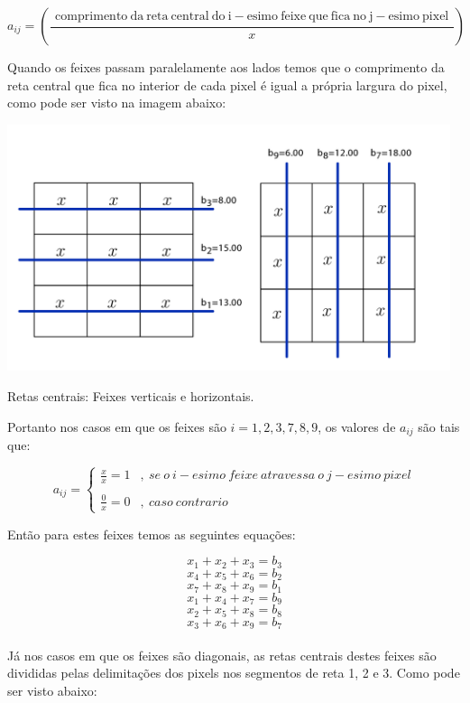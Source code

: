 \documentclass[a4paper, 12pt]{article}
\begin{document}
$$a_{ij}=\left(\frac{\begin{matrix}
\mathrm{comprimento\ da\ reta\ central\ do\ i-esimo\ feixe}\ \mathrm{que\ fica\ no\ j-esimo\ pixel}
\end{matrix}}{x}\right)$$

Quando os feixes passam paralelamente aos lados temos que o comprimento da reta central que fica no interior de cada pixel é igual a própria largura do pixel, como pode ser visto na imagem abaixo:

\begin{center}
    \includegraphics[width=13cm]{09_reta_central_vertical_horizontal.fw.png}
    
    Retas centrais: Feixes verticais e horizontais.
\end{center}

Portanto nos casos em que os feixes são $i=1, 2, 3, 7, 8, 9$, os valores de $a_{ij}$ são tais que:

$$a_{ij}=\begin{cases}
\frac{x}{x}=1&{,}\ se\ o\ i-esimo\ feixe\ atravessa\ o\ j-esimo\ pixel\\
&\\
\frac{0}{x}=0&{,}\ caso\ contrario
\end{cases}$$

Então para estes feixes temos as seguintes equações:

$$x_1+x_2+x_3=b_3$$
$$x_4+x_5+x_6=b_2$$
$$x_7+x_8+x_9=b_1$$
$$x_1+x_4+x_7=b_9$$
$$x_2+x_5+x_8=b_8$$
$$x_3+x_6+x_9=b_7$$\\

Já nos casos em que os feixes são diagonais, as retas centrais destes feixes são divididas pelas delimitações dos pixels nos segmentos de reta 1, 2 e 3. Como pode ser visto abaixo:
\end{document}
